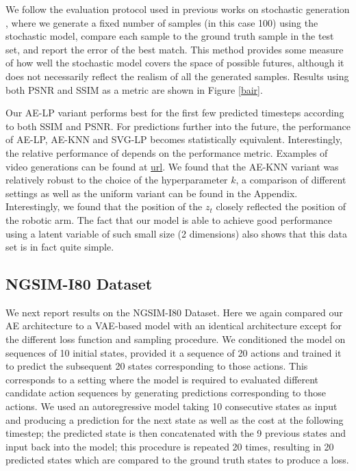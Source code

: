 \documentclass{article}
\begin{document}
We follow the evaluation protocol used in previous works on stochastic generation \citep{Walker2016, Babaeizadeh2018, Denton2018}, where we generate a fixed number of samples (in this case 100) using the stochastic model, compare each sample to the ground truth sample in the test set, and report the error of the best match.
This method provides some measure of how well the stochastic model covers the space of possible futures, although it does not necessarily reflect the realism of all the generated samples.
Results using both PSNR and SSIM \citep{SSIM} as a metric are shown in Figure \ref{bair}.


Our AE-LP variant performs best for the first few predicted timesteps according to both SSIM and PSNR. For predictions further into the future, the performance of AE-LP, AE-KNN and SVG-LP becomes statistically equivalent.  Interestingly, the relative performance of \citep{Babaeizadeh2018} depends on the performance metric. Examples of video generations can be found at \url{url}. We found that the AE-KNN variant was relatively robust to the choice of the hyperparameter $k$, a comparison of different settings as well as the uniform variant can be found in the Appendix.
Interestingly, we found that the position of the $z_t$ closely reflected the position of the robotic arm.
The fact that our model is able to achieve good performance using a latent variable of such small size (2 dimensions) also shows that this data set is in fact quite simple.


\subsection{NGSIM-I80 Dataset}

We next report results on the NGSIM-I80 Dataset. Here we again compared our AE architecture to a VAE-based model with an identical architecture except for the different loss function and sampling procedure.
We conditioned the model on sequences of 10 initial states, provided it a sequence of 20 actions and trained it to predict the subsequent 20 states corresponding to those actions.
This corresponds to a setting where the model is required to evaluated different candidate action sequences by generating predictions corresponding to those actions.
We used an autoregressive model taking 10 consecutive states as input and producing a prediction for the next state as well as the cost at the following timestep; the predicted state is then concatenated with the 9 previous states and input back into the model; this procedure is repeated 20 times, resulting in 20 predicted states which are compared to the ground truth states to produce a loss.
\end{document}
